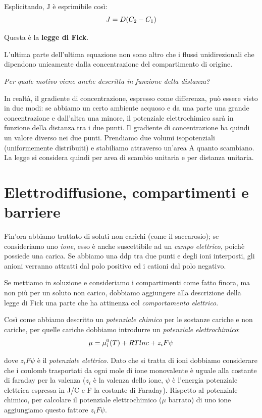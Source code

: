 \documentclass[a4paper,12pt]{article}
\begin{document}
Esplicitando, J è esprimibile così: 
\begin{equation}
\centering
J=D (C_{2}-C_{1})
\end{equation}

Questa è la \textbf{legge di Fick}.

L'ultima parte dell'ultima equazione non sono altro che i flussi unidirezionali che dipendono unicamente dalla concentrazione del compartimento di origine.

\emph{Per quale motivo viene anche descritta in funzione della distanza?}

In realtà, il gradiente di concentrazione, espresso come differenza, può essere visto in due modi: se abbiamo un certo ambiente acquoso e da una parte una grande concentrazione e dall'altra una minore, il potenziale elettrochimico sarà in funzione della distanza tra i due punti. Il gradiente di concentrazione ha quindi un valore diverso nei due punti. Prendiamo due volumi isopotenziali (uniformemente distribuiti) e stabiliamo attraverso un'area A quanto scambiano. La legge si considera quindi per area di scambio unitaria e per distanza unitaria.

\section{Elettrodiffusione, compartimenti e barriere}
Fin'ora abbiamo trattato di soluti non carichi (come il saccarosio); se consideriamo uno \emph{ione}, esso è anche suscettibile ad un \emph{campo elettrico}, poichè possiede una carica. Se abbiamo una ddp tra due punti e degli ioni interposti, gli anioni verranno attratti dal polo positivo ed i cationi dal polo negativo.

Se mettiamo in soluzione e consideriamo i compartimenti come fatto finora, ma non più per un soluto non carico, dobbiamo aggiungere alla descrizione della legge di Fick una parte che ha attinenza col \emph{comportamento elettrico}.

Così come abbiamo descritto un \emph{potenziale chimico} per le sostanze cariche e non cariche, per quelle cariche dobbiamo introdurre un \emph{potenziale elettrochimico}:
\begin{equation}
\centering
\mu= \mu_{i}^{0}(T) + RTlnc + z_{i}F\psi
\end{equation}
				
dove $z_{i}F\psi$ è il \emph{potenziale elettrico}. Dato che si tratta di ioni dobbiamo considerare che i coulomb trasportati da ogni mole di ione monovalente è uguale alla costante di faraday per la valenza ($z_{i}$ è la valenza dello ione, $\psi$ è l'energia potenziale elettrica espressa in J/C e F la costante di Faraday).
Rispetto al potenziale chimico, per calcolare il potenziale elettrochimico ($\mu$ barrato) di uno ione aggiungiamo questo fattore $z_{i}F\psi$.
\end{document}
